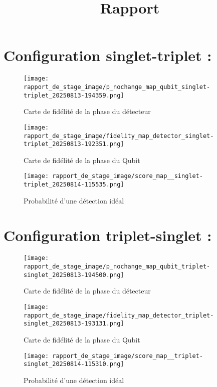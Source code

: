 \documentclass{article}
\title{Rapport}
\begin{document}
\maketitle

\section*{Configuration singlet-triplet :}

\begin{figure}[H]
    \centering
    \begin{minipage}[c]{0.48\textwidth}
        \centering
        \texttt{[image: rapport\_de\_stage\_image/p\_nochange\_map\_qubit\_singlet-triplet\_20250813-194359.png]}
        \caption{Carte de fidélité de la phase du détecteur}
        \label{fig:fidelity_map_1}
    \end{minipage}
    \hfill
    \begin{minipage}[c]{0.48\textwidth}
        \centering
        \texttt{[image: rapport\_de\_stage\_image/fidelity\_map\_detector\_singlet-triplet\_20250813-192351.png]}
        \caption{Carte de fidélité de la phase du Qubit}
        \label{fig:fidelity_map_2}
    \end{minipage}
    \centering
    \texttt{[image: rapport\_de\_stage\_image/score\_map\_\_singlet-triplet\_20250814-115535.png]}
    \caption{Probabilité d'une détection idéal}
    \label{fig:fidelity_map_detector}
\end{figure}


\section*{Configuration triplet-singlet :}

\begin{figure}[H]
    \centering
    \begin{minipage}[c]{0.48\textwidth}
        \centering
        \texttt{[image: rapport\_de\_stage\_image/p\_nochange\_map\_qubit\_triplet-singlet\_20250813-194500.png]}
        \caption{Carte de fidélité de la phase du détecteur}
        \label{fig:fidelity_map_1}
    \end{minipage}
    \hfill
    \begin{minipage}[c]{0.48\textwidth}
        \centering
        \texttt{[image: rapport\_de\_stage\_image/fidelity\_map\_detector\_triplet-singlet\_20250813-193131.png]}
        \caption{Carte de fidélité de la phase du Qubit}
        \label{fig:fidelity_map_2}
    \end{minipage}
    
    \centering
    \texttt{[image: rapport\_de\_stage\_image/score\_map\_\_triplet-singlet\_20250814-115310.png]}
    \caption{Probabilité d'une détection idéal}
    \label{fig:fidelity_map_detector}
\end{figure}
\end{document}
